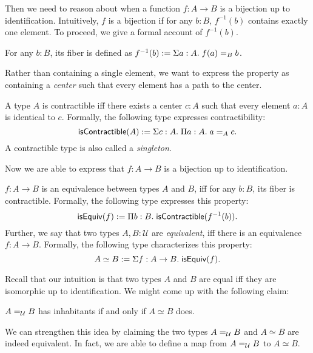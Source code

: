 \documentclass{article}
\newcommand{\calU}{\mathcal{U}}
\begin{document}
Then we need to reason about when a function $f : A \to B$ is a bijection up to 
identification.
Intuitively, $f$ is a bijection if for any $b : B$, $f^{-1}(b)$ contains exactly 
one element.
To proceed, we give a formal account of $f^{-1}(b)$.

\begin{definition}[Fibers]
	For any $b : B$, its fiber is defined as $f^{-1}(b) \eqdef \hsigtype{a}{A}{ 
	\Ideq{B}{f(a)}{b} }$.
\end{definition}

Rather than containing a single element, we want to express the property as 
containing a \emph{center} such that every element has a path to the center.

\begin{definition}[Contractibility]
	A type $A$ is contractible iff there exists a center $c : A$ such that every 
	element $a : A$ is identical to $c$.
	Formally, the following type expresses contractibility:
	\[
	\mathsf{isContractible}(A) \eqdef  \hsigtype{c}{A}{ \hpitype{a}{A}{ 
			\Ideq{A}{a}{c} } }.
	\]
	A contractible type is also called a \emph{singleton}.
\end{definition}

Now we are able to express that $f : A \to B$ is a bijection up to identification.

\begin{definition}[Equivalences]
	$f : A \to B$ is an equivalence between types $A$ and $B$, iff for any $b : B$, 
	its fiber is contractible.
	Formally, the following type expresses this property:
	\[
	\mathsf{isEquiv}(f) \eqdef  
	\hpitype{b}{B}{\mathsf{isContractible}(f^{-1}(b))}.
	\]
	Further, we say that two types $A,B : \calU$ are \emph{equivalent}, iff there 
	is an equivalence $f : A \to B$.
	Formally, the following type characterizes this property:
	\[
	A \simeq B \eqdef \hsigtype{f}{A \to B}{\mathsf{isEquiv}(f)}.
	\]
\end{definition}

Recall that our intuition is that two types $A$ and $B$ are equal iff they are 
isomorphic up to identification.
We might come up with the following claim:

\begin{proposition}
	$\Ideq{\calU}{A}{B}$ has inhabitants if and only if $A \simeq B$ does.
\end{proposition}

We can strengthen this idea by claiming the two types $\Ideq{\calU}{A}{B}$ 
and $A \simeq 
B$ are indeed equivalent.
In fact, we are able to define a map from $\Ideq{\calU}{A}{B}$ to $A 
\simeq B$.
\end{document}
